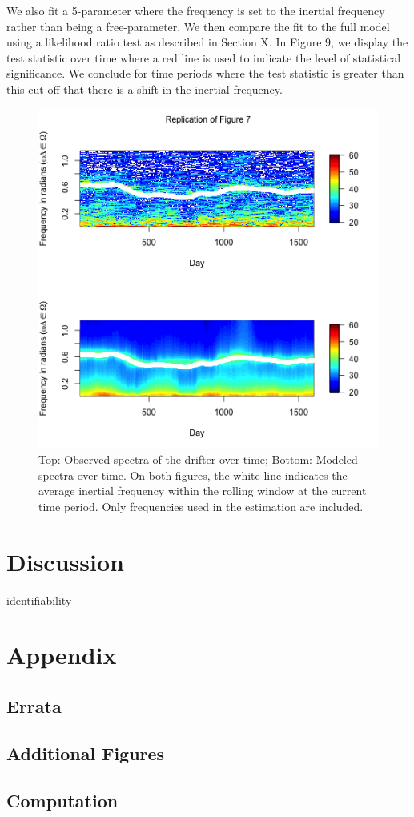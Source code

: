 \documentclass{stat572Style}
\begin{document}
We also fit a 5-parameter where the frequency is set to the inertial frequency rather than being a free-parameter. We then compare the fit to the full model using a likelihood ratio test as described in Section X. In Figure 9, we display the test statistic over time where a red line is used to indicate the level of statistical significance. We conclude for time periods where the test statistic is greater than this cut-off that there is a shift in the inertial frequency. 


\begin{figure}[hb]
	\label{fig:timeVarying}
  \centering
    \includegraphics[width=.5\textwidth]{fig7.png}
        \caption{Top: Observed spectra of the drifter over time; Bottom: Modeled spectra over time. On both figures, the white line indicates the average inertial frequency within the rolling window at the current time period.  Only frequencies used in the estimation are included.  }
\end{figure}

\section{Discussion}
identifiability 



\clearpage




\section{Appendix}

\subsection{Errata}

\subsection{Additional Figures}

\subsection{Computation}
\end{document}
